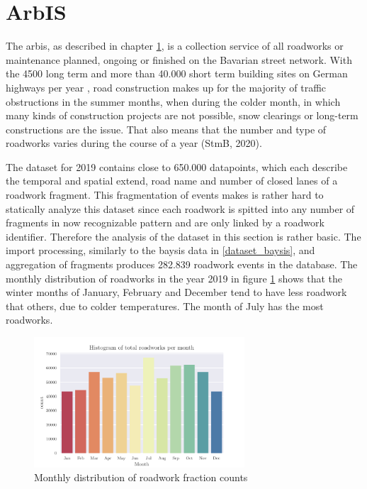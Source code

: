\documentclass[a4paper,headsepline,footsepline,fontsize=11pt,BCOR=12mm,DIV=12]{report}
\begin{document}
\section{ArbIS}
\label{dataset_arbis}

The \acrfull{arbis}, as described in chapter \ref{dataset_arbis}, is a collection service of all roadworks or maintenance planned, ongoing or finished on the Bavarian street network. With the 4500 long term and more than 40.000 short term building sites on German highways per year \cite{LAPID2018,Stmi2020}, road construction makes up for the majority of traffic obstructions in the summer months, when during the colder month, in which many kinds of construction projects are not possible, snow clearings or long-term constructions are the issue. That also means that the number and type of roadworks varies during the course of a year (StmB, 2020).

The dataset for 2019 contains close to 650.000 datapoints, which each describe the temporal and spatial extend, road name and number of closed lanes of a roadwork fragment. This fragmentation of events makes is rather hard to statically analyze this dataset since each roadwork is spitted into any number of fragments in now recognizable pattern and are only linked by a roadwork identifier. Therefore the analysis of the dataset in this section is rather basic. The import processing, similarly to the \acrshort{baysis} data in \ref{dataset_baysis}, and aggregation of fragments produces 282.839 roadwork events in the database. The monthly distribution of roadworks in the year 2019 in figure \ref{img:arbis_dataset_dist_month} shows that the winter months of January, February and December tend to have less roadwork that others, due to colder temperatures. The month of July has the most roadworks.

\begin{figure}[h]
	\centering
	\includegraphics[width=0.7\textwidth]{../CorrAnalysis/data/ArbIS/01_dataset/plots/arbis_dataset_hist_month}
	\caption{Monthly distribution of roadwork fraction counts}
	\label{img:arbis_dataset_dist_month}
\end{figure}
\end{document}
